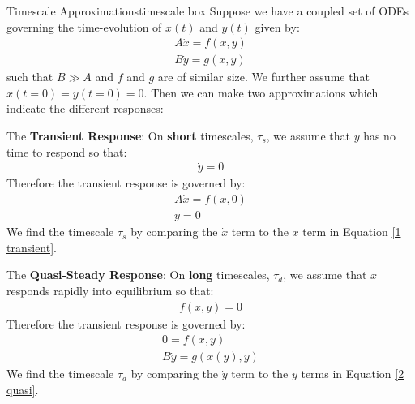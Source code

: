 \begin{fact}{Timescale Approximations}{timescale box}\label{timescale box}
    Suppose we have a coupled set of ODEs governing the time-evolution of $x(t)$ and $y(t)$ given by:
    \begin{align*}
        A \dot{x}=f(x,y)\\
        B \dot{y} = g(x,y)
    \end{align*}
    such that $B\gg A$ and $f$ and $g$ are of similar size. We further assume that $x(t=0)=y(t=0)=0$. Then we can make two approximations which indicate the different responses:

    \begin{minipage}{.5\linewidth}
        \begin{tcolorbox}[colback=myyellow!50!white,colframe=mymagenta]
            The \textbf{Transient Response}: On \textbf{short} timescales, $\tau_s$, we assume that $y$ has no time to respond so that:
            \begin{gather*}
                \dot{y}=0
            \end{gather*}
            Therefore the transient response is governed by:
            \begin{align}
                \label{1 transient}
                \boxed{A\dot{x}=f(x,0)}\\
                \boxed{y=0}
            \end{align}
            We find the timescale $\tau_s$ by comparing the $\dot{x}$ term to the $x$ term in Equation \ref{1 transient}.
        \end{tcolorbox}
    \end{minipage}
    \begin{minipage}{.5\linewidth}
        \begin{tcolorbox}[colback=myyellow!50!white,colframe=mymagenta]
            The \textbf{Quasi-Steady Response}: On \textbf{long} timescales, $\tau_d$, we assume that $x$ responds rapidly into equilibrium so that:
            \begin{gather*}
                f(x,y)=0
            \end{gather*}
            Therefore the transient response is governed by:
            \begin{align}
                \boxed{0=f(x,y)}\\
                \label{2 quasi}
                \boxed{B\dot{y}=g(x(y),y)}
            \end{align}
            We find the timescale $\tau_d$ by comparing the $\dot{y}$ term to the $y$ terms in Equation \ref{2 quasi}.
        \end{tcolorbox}
    \end{minipage}
\end{fact}

